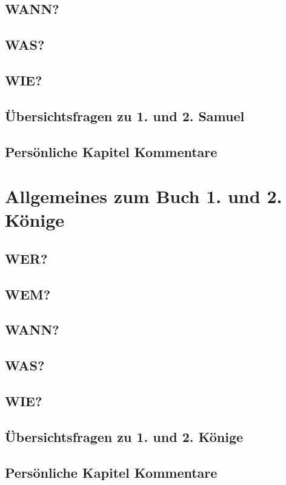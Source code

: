 \subsection{WANN?}
\subsection{WAS?}
\subsection{WIE?}
\subsection{Übersichtsfragen zu 1. und 2. Samuel}
    
\subsection{Persönliche Kapitel Kommentare}
\section{Allgemeines zum Buch 1. und 2. Könige}
\subsection{WER?}
\subsection{WEM?}
\subsection{WANN?}
\subsection{WAS?}
\subsection{WIE?}
\subsection{Übersichtsfragen zu 1. und 2. Könige}
    
\subsection{Persönliche Kapitel Kommentare}
